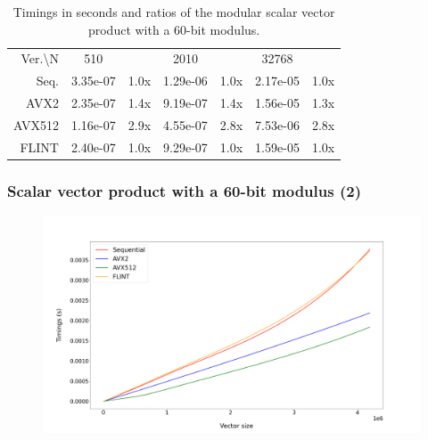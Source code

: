 \documentclass[10pt]{beamer}
\begin{document}
\begin{frame}
\begin{table}[h!]
        \begin{tabular}{|r|*{3}{c c|}}
            \hline
            \rowcolor{myGray}
            \multicolumn{7}{|c|}{\textsc{Zen 4}} \\
    
            \hline
            \rowcolor{myGray}
            Ver.\textbackslash N & 510 & & 2010 & & 32768 & \\
            \hline
            \cellcolor{myGray} Seq. & 3.35e-07 & 1.0x & 1.29e-06 & 1.0x & 2.17e-05 & 1.0x \\
            \hline
            \cellcolor{myGray} AVX2 & 2.35e-07 & 1.4x & 9.19e-07 & 1.4x & 1.56e-05 & 1.3x \\
            \hline
            \cellcolor{myGray} AVX512 & 1.16e-07 & 2.9x & 4.55e-07 & 2.8x & 7.53e-06 & 2.8x \\
            \hline
            \cellcolor{myGray} FLINT & 2.40e-07 & 1.0x & 9.29e-07 & 1.0x & 1.59e-05 & 1.0x \\
            \hline
        \end{tabular}
        \caption{Timings in seconds and ratios of the modular scalar vector product with a 60-bit modulus.}
    \end{table}
\end{frame}

\begin{frame}
    \frametitle{Scalar vector product with a 60-bit modulus (2)}

    \begin{figure}[h!]
        \begin{center}
            \includegraphics[width=1\textwidth]{scalar-vector-mod_argiope.png}
        \end{center}
    \end{figure}
\end{frame}
\end{document}
